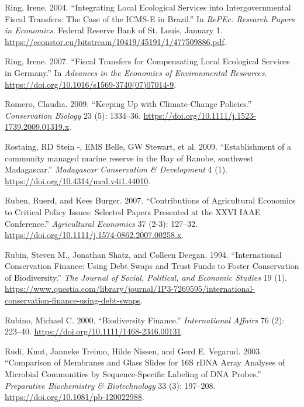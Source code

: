 \begin{CSLReferences}{1}{1}
Ring, Irene. 2004. {``Integrating Local Ecological Services into
Intergovernmental Fiscal Transfers: The Case of the ICMS-E in Brazil.''}
In \emph{RePEc: Research Papers in Economics}. Federal Reserve Bank of
St. Louis, January 1.
\url{https://econstor.eu/bitstream/10419/45191/1/477509886.pdf}.

Ring, Irene. 2007. {``Fiscal Transfers for Compensating Local Ecological
Services in Germany.''} In \emph{Advances in the Economics of
Environmental Resources}.
\url{https://doi.org/10.1016/s1569-3740(07)07014-9}.

Romero, Claudia. 2009. {``Keeping Up with Climate‐Change Policies.''}
\emph{Conservation Biology} 23 (5): 1334--36.
\url{https://doi.org/10.1111/j.1523-1739.2009.01319.x}.

Rostaing, RD Stein -, EMS Belle, GW Stewart, et al. 2009.
{``Establishment of a community managed marine reserve in the Bay of
Ranobe, southwest Madagascar.''} \emph{Madagascar Conservation \&
Development} 4 (1). \url{https://doi.org/10.4314/mcd.v4i1.44010}.

Ruben, Ruerd, and Kees Burger. 2007. {``Contributions of Agricultural
Economics to Critical Policy Issues: Selected Papers Presented at the
XXVI IAAE Conference.''} \emph{Agricultural Economics} 37 (2-3):
127--32. \url{https://doi.org/10.1111/j.1574-0862.2007.00258.x}.

Rubin, Steven M., Jonathan Shatz, and Colleen Deegan. 1994.
{``International Conservation Finance: Using Debt Swaps and Trust Funds
to Foster Conservation of Biodiversity.''} \emph{The Journal of Social,
Political, and Economic Studies} 19 (1).
\url{https://www.questia.com/library/journal/1P3-7269595/international-conservation-finance-using-debt-swaps}.

Rubino, Michael C. 2000. {``Biodiversity Finance.''} \emph{International
Affairs} 76 (2): 223--40. \url{https://doi.org/10.1111/1468-2346.00131}.

Rudi, Knut, Janneke Treimo, Hilde Nissen, and Gerd E. Vegarud. 2003.
{``Comparison of Membranes and Glass Slides for 16S rDNA Array Analyses
of Microbial Communities by Sequence-Specific Labeling of DNA Probes.''}
\emph{Preparative Biochemistry \& Biotechnology} 33 (3): 197--208.
\url{https://doi.org/10.1081/pb-120022988}.


\end{CSLReferences}
